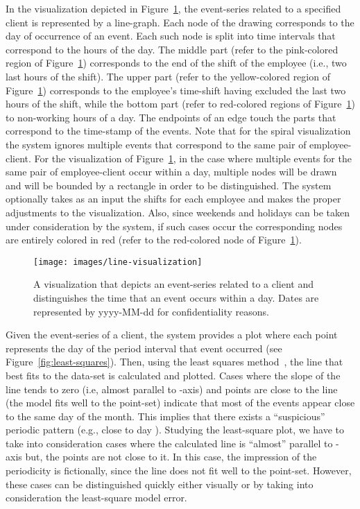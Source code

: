 \documentclass[conference]{IEEEtran}
\begin{document}
In the visualization depicted in
Figure~\ref{fig:line-visualization}, the event-series related to a
specified client is represented by a line-graph. Each node of the
drawing corresponds to the day of occurrence of an event. Each such
node is split into time intervals that correspond to the hours of
the day. The middle part (refer to the pink-colored region of
Figure~\ref{fig:line-visualization}) corresponds to the end of the
shift of the employee (i.e., two last hours of the shift). The upper
part (refer to the yellow-colored region of
Figure~\ref{fig:line-visualization}) corresponds to the employee's
time-shift having excluded the last two hours of the shift, while
the bottom part (refer to red-colored regions of
Figure~\ref{fig:line-visualization}) to non-working hours of a day.
The endpoints of an edge touch the parts that correspond to the
time-stamp of the events. Note that for the spiral visualization the
system ignores multiple events that correspond to the same pair of
employee-client. For the visualization of
Figure~\ref{fig:line-visualization}, in the case where multiple
events for the same pair of employee-client occur within a day,
multiple nodes will be drawn and will be bounded by a rectangle in
order to be distinguished. The system optionally takes as an input
the shifts for each employee and makes the proper adjustments to the
visualization. Also, since weekends and holidays can be taken under
consideration by the system, if such cases occur the corresponding
nodes are entirely colored in red (refer to the red-colored node of
Figure~\ref{fig:line-visualization}).

\begin{figure}[h!tb]
  \texttt{[image: images/line-visualization]}
  \caption{A visualization that depicts an event-series related to a client and distinguishes the time that an event occurs within a day. Dates are represented by yyyy-MM-dd for confidentiality reasons.}
  \label{fig:line-visualization}
\end{figure}

Given the event-series of a client, the system provides a plot where
each point  represents the day  of the period interval
that event  occurred (see Figure~\ref{fig:least-squares}). Then,
using the least squares method~\cite{DS81}, the line that best fits
to the data-set is calculated and plotted. Cases where the slope of
the line tends to zero (i.e, almost parallel to -axis) and points
are close to the line (the model fits well to the point-set)
indicate that most of the events appear close to the same day of the
month. This implies that there exists a ``suspicious'' periodic
pattern (e.g., close to day ). Studying the least-square plot,
we have to take into consideration cases where the calculated line
is ``almost'' parallel to -axis but, the points are not close to
it. In this case, the impression of the periodicity is fictionally,
since the line does not fit well to the point-set. However, these
cases can be distinguished quickly either visually or by taking into
consideration the least-square model error.
\end{document}

